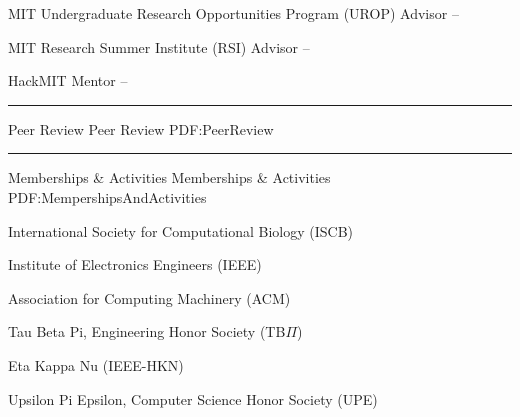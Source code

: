 \documentclass[letterpaper,MMMyyyy,nonstopmode]{simpleresumecv}
\begin{document}
\begin{Body}
\Entry
{MIT Undergraduate Research Opportunities Program (UROP) Advisor}
\hfill
{} -- 
\Gap

\Entry
{MIT Research Summer Institute (RSI) Advisor}
\hfill
{} -- 
\Gap

\Entry
{HackMIT Mentor}
\hfill
{} -- 
\Gap



\BigGap
\hrule
\Section
{Peer Review}
{Peer Review}
{PDF:PeerReview}

\BigGap
\hrule
\Section
{Memberships\newline
\& Activities}
{Memberships \& Activities}
{PDF:MempershipsAndActivities}

\Entry
{International Society for Computational Biology (ISCB)}
\hfill
\Gap

\Entry
{Institute of Electronics Engineers (IEEE)}
\hfill
\Gap

\Entry
{Association for Computing Machinery (ACM)}
\hfill
\Gap

\Entry
{Tau Beta Pi, Engineering Honor Society (TB$\Pi$)}
\hfill
\Gap

\Entry
{Eta Kappa Nu (IEEE-HKN)}
\hfill
\Gap

\Entry
{Upsilon Pi Epsilon, Computer Science Honor Society (UPE)}
\hfill
\Gap



\end{Body}
\end{document}
